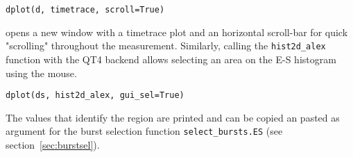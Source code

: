 \begin{verbatim}
dplot(d, timetrace, scroll=True)
\end{verbatim}

opens a new window with a timetrace plot and an horizontal scroll-bar for quick
"scrolling" throughout the measurement.
Similarly, calling the \verb|hist2d_alex| function with the QT4 backend allows
selecting an area on the E-S histogram using the mouse.

\begin{verbatim}
dplot(ds, hist2d_alex, gui_sel=True)
\end{verbatim}

The values that identify the region are printed and can be copied an pasted as
argument for the burst selection function \verb|select_bursts.ES| (see
section~\ref{sec:burstsel}).
